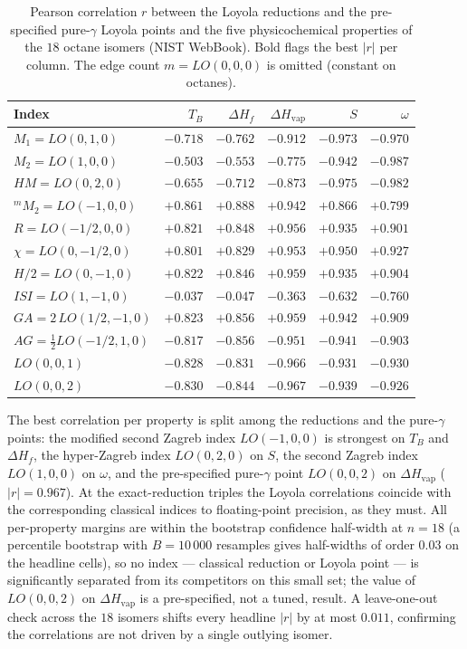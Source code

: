 \documentclass[a5paper, 10pt]{article}
\theoremstyle{plain}
\theoremstyle{remark}
\theoremstyle{definition}
\begin{document}
\begin{table}[H]
\centering
\caption{Pearson correlation $r$ between the Loyola reductions and the pre-specified pure-$\gamma$ Loyola points and the five physicochemical properties of the $18$ octane isomers (NIST WebBook). Bold flags the best $|r|$ per column. The edge count $m = LO(0,0,0)$ is omitted (constant on octanes).}
\label{tab:lo_octane}
\small
\begin{tabular}{lrrrrr}
\toprule
Index & $T_B$ & $\Delta H_f$ & $\Delta H_{\mathrm{vap}}$ & $S$ & $\omega$\\
\midrule
$M_1 = LO(0,1,0)$ & $-0.718$ & $-0.762$ & $-0.912$ & $-0.973$ & $-0.970$\\
$M_2 = LO(1,0,0)$ & $-0.503$ & $-0.553$ & $-0.775$ & $-0.942$ & $\mathbf{-0.987}$\\
$HM = LO(0,2,0)$ & $-0.655$ & $-0.712$ & $-0.873$ & $\mathbf{-0.975}$ & $-0.982$\\
${}^{m}\!M_2 = LO(-1,0,0)$ & $\mathbf{+0.861}$ & $\mathbf{+0.888}$ & $+0.942$ & $+0.866$ & $+0.799$\\
$R = LO(-1/2,0,0)$ & $+0.821$ & $+0.848$ & $+0.956$ & $+0.935$ & $+0.901$\\
$\chi = LO(0,-1/2,0)$ & $+0.801$ & $+0.829$ & $+0.953$ & $+0.950$ & $+0.927$\\
$H/2 = LO(0,-1,0)$ & $+0.822$ & $+0.846$ & $+0.959$ & $+0.935$ & $+0.904$\\
$ISI = LO(1,-1,0)$ & $-0.037$ & $-0.047$ & $-0.363$ & $-0.632$ & $-0.760$\\
$GA = 2\,LO(1/2,-1,0)$ & $+0.823$ & $+0.856$ & $+0.959$ & $+0.942$ & $+0.909$\\
$AG = \tfrac12 LO(-1/2,1,0)$ & $-0.817$ & $-0.856$ & $-0.951$ & $-0.941$ & $-0.903$\\
$LO(0,0,1)$ & $-0.828$ & $-0.831$ & $-0.966$ & $-0.931$ & $-0.930$\\
$LO(0,0,2)$ & $-0.830$ & $-0.844$ & $\mathbf{-0.967}$ & $-0.939$ & $-0.926$\\
\bottomrule
\end{tabular}
\end{table}

The best correlation per property is split among the reductions and
the pure-$\gamma$ points: the modified second Zagreb index
$LO(-1, 0, 0)$ is strongest on $T_B$ and $\Delta H_f$, the
hyper-Zagreb index $LO(0, 2, 0)$ on $S$, the second Zagreb index
$LO(1, 0, 0)$ on $\omega$, and the pre-specified pure-$\gamma$ point
$LO(0, 0, 2)$ on $\Delta H_{\mathrm{vap}}$ ($|r| = 0.967$). At the
exact-reduction triples the Loyola correlations coincide with the
corresponding classical indices to floating-point precision, as they
must. All per-property margins are within the bootstrap confidence
half-width at $n = 18$ (a percentile bootstrap with
$B = 10\,000$ resamples gives half-widths of order $0.03$ on the
headline cells), so no index --- classical reduction or Loyola point
--- is significantly separated from its competitors on this small
set; the value of $LO(0, 0, 2)$ on $\Delta H_{\mathrm{vap}}$ is a
pre-specified, not a tuned, result. A leave-one-out check across the
$18$ isomers shifts every headline $|r|$ by at most $0.011$,
confirming the correlations are not driven by a single outlying
isomer.
\end{document}
